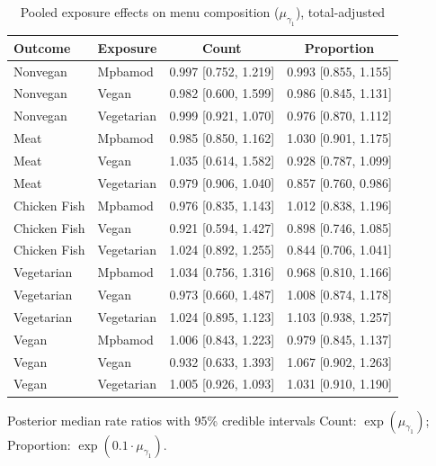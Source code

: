 \begin{table}[H]
\centering
\caption{Pooled exposure effects on menu composition ($\mu_{\gamma_1}$), total-adjusted}
\label{tab:a1_mu_gamma_adj}
\begin{tabular}{llcc}
\toprule
Outcome & Exposure & Count & Proportion \\
\midrule
Nonvegan & Mpbamod & 0.997 [0.752, 1.219] & 0.993 [0.855, 1.155] \\
Nonvegan & Vegan & 0.982 [0.600, 1.599] & 0.986 [0.845, 1.131] \\
Nonvegan & Vegetarian & 0.999 [0.921, 1.070] & 0.976 [0.870, 1.112] \\
Meat & Mpbamod & 0.985 [0.850, 1.162] & 1.030 [0.901, 1.175] \\
Meat & Vegan & 1.035 [0.614, 1.582] & 0.928 [0.787, 1.099] \\
Meat & Vegetarian & 0.979 [0.906, 1.040] & 0.857 [0.760, 0.986] \\
Chicken Fish & Mpbamod & 0.976 [0.835, 1.143] & 1.012 [0.838, 1.196] \\
Chicken Fish & Vegan & 0.921 [0.594, 1.427] & 0.898 [0.746, 1.085] \\
Chicken Fish & Vegetarian & 1.024 [0.892, 1.255] & 0.844 [0.706, 1.041] \\
Vegetarian & Mpbamod & 1.034 [0.756, 1.316] & 0.968 [0.810, 1.166] \\
Vegetarian & Vegan & 0.973 [0.660, 1.487] & 1.008 [0.874, 1.178] \\
Vegetarian & Vegetarian & 1.024 [0.895, 1.123] & 1.103 [0.938, 1.257] \\
Vegan & Mpbamod & 1.006 [0.843, 1.223] & 0.979 [0.845, 1.137] \\
Vegan & Vegan & 0.932 [0.633, 1.393] & 1.067 [0.902, 1.263] \\
Vegan & Vegetarian & 1.005 [0.926, 1.093] & 1.031 [0.910, 1.190] \\
\bottomrule
\end{tabular}
\par\smallskip\footnotesize Posterior median rate ratios with 95\% credible intervals Count: $\exp(\mu_{\gamma_1})$; Proportion: $\exp(0.1 \cdot \mu_{\gamma_1})$.
\end{table}
